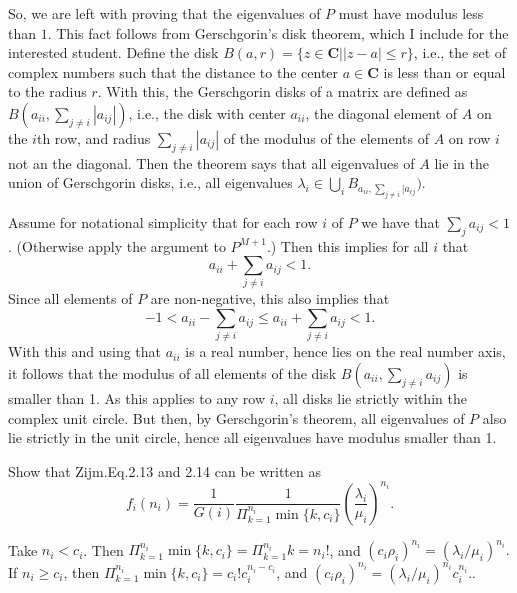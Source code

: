 \begin{question}
\begin{solution}
So, we are left with proving that the eigenvalues of $P$ must have
modulus less than $1$. This fact follows from Gerschgorin's disk
theorem, which I include for the interested student. Define the disk
$B(a,r)=\{z\in \mathbf{C}| |z-a|\leq r\}$, i.e., the set of complex
numbers such that the distance to the center $a\in \mathbf{C}$ is less
than or equal to the radius $r$. With this, the Gerschgorin disks of a
matrix are defined as $B(a_{ii}, \sum_{j\neq i} |a_{ij}|)$, i.e., the
disk with center $a_{ii}$, the diagonal element of $A$ on the $i$th
row, and radius $\sum_{j\neq i} |a_{ij}|$ of the modulus of the
elements of $A$ on row $i$ not an the diagonal. Then the theorem says
that all eigenvalues of $A$ lie in the union of Gerschgorin disks,
i.e., all eigenvalues
$\lambda_i \in \bigcup_i B_{a_{ii}, \sum_{j\neq i}|a_{ij}})$.

Assume for notational simplicity that for each row $i$ of $P$ we have
that $\sum_{j} a_{ij}<1$. (Otherwise apply the argument to $P^{M+1}$.)
Then this implies for all $i$ that
\begin{equation*}
  a_{ii} + \sum_{j\neq i} a_{ij} < 1. 
\end{equation*}
Since all elements of $P$ are non-negative, this also implies that
\begin{equation*}
-1 <   a_{ii} - \sum_{j\neq i} a_{ij} \leq  a_{ii} + \sum_{j\neq i} a_{ij} < 1. 
\end{equation*}
With this and using that $a_{ii}$ is a real number, hence lies on the
real number axis, it follows that the modulus of all elements of the
disk $B(a_{ii}, \sum_{j\neq i} a_{ij})$ is smaller than 1.  As this
applies to any row $i$, all disks lie strictly within the complex unit
circle. But then, by Gerschgorin's theorem, all eigenvalues of $P$
also lie strictly in the unit circle, hence all eigenvalues have
modulus smaller than 1.
\end{solution}
\end{question}

\begin{question}\label{ex:23}
  Show that Zijm.Eq.2.13 and 2.14 can be written as
  \begin{equation*}
    f_i(n_i) = \frac{1}{G(i)}\frac{1}{\Pi_{k=1}^{n_i} \min\{k, c_i\}}\left( \frac{\lambda_i}{\mu_i}\right)^{n_i}.
  \end{equation*}
  \begin{solution}
    Take $n_i<c_i$. Then
    $\Pi_{k=1}^{n_i} \min\{k, c_i\} = \Pi_{k=1}^{n_i} k = n_i!$, and
    $(c_i\rho_i)^{n_i} = (\lambda_i/\mu_i)^{n_i}.$ If $n_i\geq c_i$,
    then $\Pi_{k=1}^{n_i} \min\{k, c_i\} = c_i! c_i^{n_i-c_i}$, and
    $(c_i\rho_i)^{n_i} = (\lambda_i/\mu_i)^{n_i} c_i^{n_i}.$.
  \end{solution}
\end{question}


